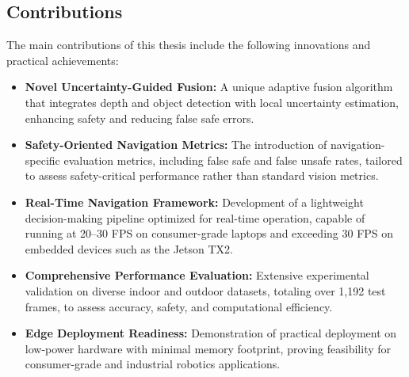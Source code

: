 \documentclass[12pt,oneside]{book}
\begin{document}
\subsection{Contributions}
The main contributions of this thesis include the following innovations and practical achievements:
\begin{itemize}
    \item \textbf{Novel Uncertainty-Guided Fusion:} A unique adaptive fusion algorithm that integrates depth and object detection with local uncertainty estimation, enhancing safety and reducing false safe errors.
    \item \textbf{Safety-Oriented Navigation Metrics:} The introduction of navigation-specific evaluation metrics, including false safe and false unsafe rates, tailored to assess safety-critical performance rather than standard vision metrics.
    \item \textbf{Real-Time Navigation Framework:} Development of a lightweight decision-making pipeline optimized for real-time operation, capable of running at 20–30 FPS on consumer-grade laptops and exceeding 30 FPS on embedded devices such as the Jetson TX2.
    \item \textbf{Comprehensive Performance Evaluation:} Extensive experimental validation on diverse indoor and outdoor datasets, totaling over 1,192 test frames, to assess accuracy, safety, and computational efficiency.
    \item \textbf{Edge Deployment Readiness:} Demonstration of practical deployment on low-power hardware with minimal memory footprint, proving feasibility for consumer-grade and industrial robotics applications.
\end{itemize}
\end{document}
